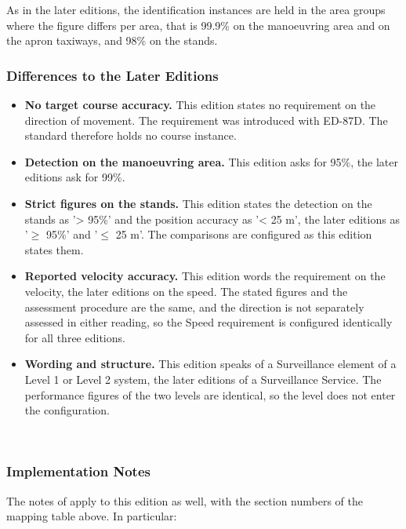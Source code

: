 As in the later editions, the identification instances are held in the area groups where the figure differs per area, that is 99.9\% on the manoeuvring area and on the apron taxiways, and 98\% on the stands. \\

\subsubsection{Differences to the Later Editions}

\begin{itemize}
\item \textbf{No target course accuracy.} This edition states no requirement on the direction of movement. The requirement was introduced with ED-87D. The standard therefore holds no course instance.
\item \textbf{Detection on the manoeuvring area.} This edition asks for 95\%, the later editions ask for 99\%.
\item \textbf{Strict figures on the stands.} This edition states the detection on the stands as '> 95\%' and the position accuracy as '< 25 m', the later editions as '$\geq$ 95\%' and '$\leq$ 25 m'. The comparisons are configured as this edition states them.
\item \textbf{Reported velocity accuracy.} This edition words the requirement on the velocity, the later editions on the speed. The stated figures and the assessment procedure are the same, and the direction is not separately assessed in either reading, so the Speed requirement is configured identically for all three editions.
\item \textbf{Wording and structure.} This edition speaks of a Surveillance element of a Level 1 or Level 2 system, the later editions of a Surveillance Service. The performance figures of the two levels are identical, so the level does not enter the configuration.
\end{itemize}
\ \\

\subsubsection{Implementation Notes}

The notes of  apply to this edition as well, with the section numbers of the mapping table above. In particular:

